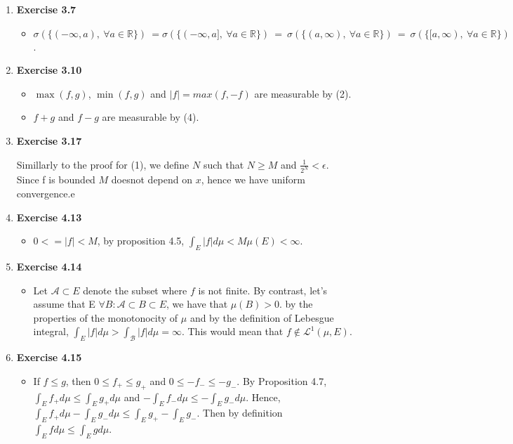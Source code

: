 \documentclass[12pt, letterpaper,bibtotoc, tablecaptionabove, figurecaptionabove]{article}
\begin{document}
\begin{enumerate}
\item{\bf{Exercise 3.7}}
\begin{itemize}
\item $\sigma(\{(-\infty,a), \ \forall a\in \mathbb R\}) \ = \sigma(\{(-\infty,a], \ \forall a\in \mathbb R\}) \ = \ \sigma(\{(a,\infty), \ \forall a\in \mathbb R\}) \ = \ \sigma(\{[a,\infty), \ \forall a\in \mathbb R\}) \ = \mathcal B(\mathbb R)$.
\end{itemize}

\item{\bf{Exercise 3.10}}
\begin{itemize}
\item $\max(f,g)$, $\min(f,g)$ and $ |f|=max(f,-f)$ are measurable by (2).
\item $f+g$ and $f-g$ are measurable by (4).
\end{itemize}

\item{\bf{Exercise 3.17}}
\begin{itemize}
Simillarly to the proof for (1), we define $N$ such that $N\geq M$ and $\frac{1}{2^N}<\epsilon$. Since f is bounded $M$ doesnot depend on $x$, hence we have uniform convergence.e
\end{itemize}


\item{\bf{Exercise 4.13}}
\begin{itemize}
\item $0<=|f|<M$, by proposition 4.5, $\int_E |f|d\mu < M\mu(E)<\infty$. 
\end{itemize}

\item{\bf{Exercise 4.14}}
\begin{itemize}
\item Let $\mathcal A \subset E$ denote the subset where $f$ is not finite. By contrast, let's assume that E  $\forall B: \mathcal A \subset B\subset E$, we have that $\mu(B)>0$. by the properties of the monotonocity of $\mu$ and by the definition of Lebesgue integral, $\int_E |f| d\mu > \int_\mathcal{B}|f| d\mu=\infty$. This would mean that $f \notin \mathcal L^1(\mu,E)$.
\end{itemize}

\item{\bf{Exercise 4.15}}
\begin{itemize}
\item If  $f\leq g$, then $0\leq f_+\leq g_+$ and $0\leq -f_-\leq-g_-$. By Proposition 4.7, $\int_E f_+d\mu\leq\int_E g_+d\mu$ and $-\int_Ef_-d\mu\leq -\int_E g_-d\mu$. Hence,$\int_E f_+d\mu-\int_E g_- d\mu\leq \int_E g_+-\int_E g_-$. Then by definition $\int_E fd\mu\leq \int_E g d\mu$.
\end{itemize}


\end{enumerate}
\end{document}
